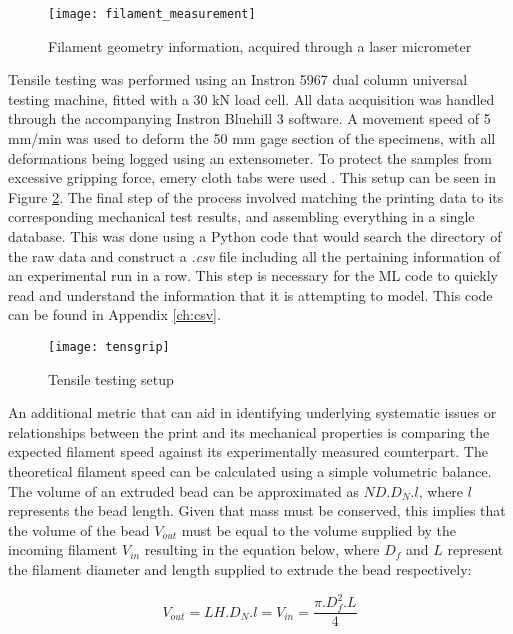 \documentclass[main.tex]{subfiles}
\begin{document}
\begin{figure}[!htbp]
	\center
	\texttt{[image: filament\_measurement]}
	\caption{Filament geometry information, acquired through a laser micrometer } \label{fig:FD}
\end{figure}

Tensile testing was performed using an Instron 5967 dual column universal testing machine, fitted with a 30 kN load cell. All data acquisition was handled through the accompanying Instron Bluehill 3 software. A movement speed of 5 mm/min was used to deform the 50 mm gage section of the specimens, with all deformations being logged using an extensometer. To protect the samples from excessive gripping force, emery cloth tabs were used \cite{Capote2017}. This setup can be seen in Figure \ref{fig:testsetup}. The final step of the process involved matching the printing data to its corresponding mechanical test results, and assembling everything in a single database. This was done using a Python code that would search the directory of the raw data and construct a \emph{.csv} file including all the pertaining information of an experimental run in a row. This step is necessary for the ML code to quickly read and understand the information that it is attempting to model. This code can be found in Appendix \ref{ch:csv}. 

\begin{figure}[h]
	\center
	\texttt{[image: tensgrip]}
	\caption{Tensile testing setup} \label{fig:testsetup}
\end{figure} 

An additional metric that can aid in identifying underlying systematic issues or relationships between the print and its mechanical properties is comparing the expected filament speed against its experimentally measured counterpart. The theoretical filament speed can be calculated using a simple volumetric balance. The volume of an extruded bead can be approximated as $ND. D_{N}. l$, where $l$ represents the bead length. Given that mass must be conserved, this implies that the volume of the bead $V_{out}$ must be equal to the volume supplied by the incoming filament $V_{in}$ resulting in the equation below, where $D_{f}$ and $L$ represent the filament diameter and length supplied to extrude the bead respectively:

\begin{equation} \label{eq:v_b_1}
	V_{out}= LH . D_{N} . l = V_{in} = \frac{\pi . D_{f}^2 . L}{4}
\end{equation}
\end{document}
